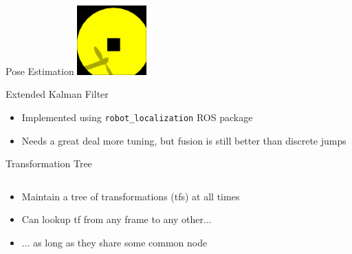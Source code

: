 \documentclass[]{beamer}
\begin{document}
\begin{frame}{Pose Estimation}
        \includegraphics[width=0.2\textwidth]{../images/image1_38233000_proc.png}
\end{frame}

{
    \usebackgroundtemplate{}
\begin{frame}[fragile]{Extended Kalman Filter}
    \begin{overlayarea}{\textwidth}{6cm}
        \scalebox{0.8}{}
        \vspace{-5cm}
        \begin{itemize}
            \item Implemented using \verb|robot_localization| ROS package
            \item Needs a great deal more tuning, but fusion is still better than discrete jumps
        \end{itemize}
    \end{overlayarea}
\end{frame}
}

\begin{frame}{Transformation Tree}
    \begin{columns}
        \begin{column}{0.4\textwidth}
            \begin{itemize}
                \item Maintain a tree of transformations (tfs) at all times
                \item Can lookup tf from any frame to any other...
                \item ... as long as they share some common node
            \end{itemize}
        \end{column}
        \begin{column}{0.6\textwidth}
        \end{column}
    \end{columns}
\end{frame}
\end{document}
